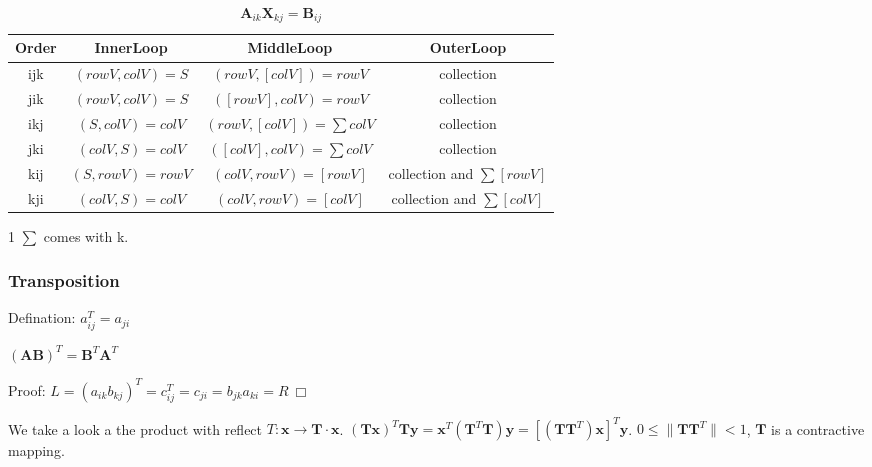 \documentclass[UTF8]{../../09-Mathematics}
\begin{document}
\begin{table}[htbp]
    \newcommand{\tabincell}[2]{\begin{tabular}{@{}#1@{}}#2\end
    {tabular}}
    \centering
    \begin{threeparttable}
    \caption{$\boldsymbol A_{ik} \boldsymbol X_{kj} = \boldsymbol B_{ij}$ }
    \begin{tabular}{cccc}
        \toprule
        Order & InnerLoop & MiddleLoop & OuterLoop \\
        \midrule
        ijk & $(rowV, colV) = S$ & $(rowV, [colV]) = rowV$ & collection \\
        jik & $(rowV, colV) = S$ & $([rowV], colV) = rowV$ & collection \\

        ikj & $(S, colV) = colV$ & $(rowV, [colV]) = \sum colV$ & collection \\
        jki& $(colV, S) = colV$ & $([colV], colV) = \sum colV$ & collection \\

        kij& $(S, rowV) = rowV$ & $(colV, rowV) = [rowV] $ & collection and $\sum [rowV] $ \\
        kji& $(colV, S) = colV$ & $(colV, rowV) = [colV] $ & collection and $\sum [colV] $ \\
        \bottomrule
    \end{tabular}
    \begin{tablenotes}
        \item[1] $\sum$ comes with k.
      \end{tablenotes}
    \end{threeparttable}
\end{table}






\subsubsection{Transposition}


Defination: $a_{ij}^T = a_{ji}$

\begin{proposition}
    $(\boldsymbol {AB})^T = \boldsymbol B ^T \boldsymbol A^T$

    Proof: $L = (a_{ik}b_{kj})^T = c_{ij}^T = c_{ji} = b_{jk}a_{ki} = R \ \Box$
\end{proposition}

\begin{proposition}
    We take a look a the product with reflect $T : \boldsymbol x \rightarrow  \boldsymbol{T} \cdot \boldsymbol{x}$.
    $(\boldsymbol {Tx})^T \boldsymbol {Ty} = \boldsymbol x^T(\boldsymbol T^T \boldsymbol T) \boldsymbol y = [(\boldsymbol T \boldsymbol T^T) \boldsymbol x]^T \boldsymbol y$. $0 \leqslant \|\boldsymbol T \boldsymbol T^T\| < 1$, $\boldsymbol T$ is a contractive mapping.
\end{proposition}
\end{document}

